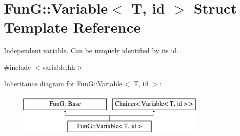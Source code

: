\hypertarget{structFunG_1_1Variable}{}\section{Fun\+G\+:\+:Variable$<$ T, id $>$ Struct Template Reference}
\label{structFunG_1_1Variable}


Independent variable. Can be uniquely identified by its id.  




{\ttfamily \#include $<$variable.\+hh$>$}

Inheritance diagram for Fun\+G\+:\+:Variable$<$ T, id $>$\+:\begin{figure}[H]
\begin{center}
\leavevmode
\includegraphics[height=2.000000cm]{structFunG_1_1Variable}
\end{center}
\end{figure}
